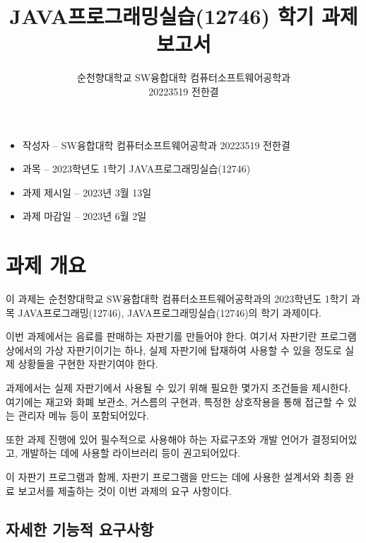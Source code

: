 \documentclass{oblivoir}
\title{JAVA프로그래밍실습(12746) 학기 과제 보고서}
\author{순천향대학교 SW융합대학 컴퓨터소프트웨어공학과\\20223519 전한결}
\begin{document}
    \maketitle

    \begin{itemize}
        \item 작성자 – SW융합대학 컴퓨터소프트웨어공학과 20223519 전한결
        \item 과목 – 2023학년도 1학기 JAVA프로그래밍실습(12746)
        \item 과제 제시일 – 2023년 3월 13일
        \item 과제 마감일 – 2023년 6월 2일
    \end{itemize}

    \pagebreak

    \tableofcontents

    \pagebreak

    \section{과제 개요}
    \label{sec:overview}

    이 과제는 순천향대학교 SW융합대학 컴퓨터소프트웨어공학과의
    2023학년도 1학기 과목 JAVA프로그래밍(12746), JAVA프로그래밍실습(12746)의
    학기 과제이다.

    이번 과제에서는 음료를 판매하는 자판기를 만들어야 한다.
    여기서 자판기란 프로그램상에서의 가상 자판기이기는 하나,
    실제 자판기에 탑재하여 사용할 수 있을 정도로 실제 상황들을
    구현한 자판기여야 한다.

    과제에서는 실제 자판기에서 사용될 수 있기 위해 필요한 몇가지
    조건들을 제시한다.
    여기에는 재고와 화폐 보관소, 거스름의 구현과, 특정한 상호작용을 통해
    접근할 수 있는 관리자 메뉴 등이 포함되어있다.

    또한 과제 진행에 있어 필수적으로 사용해야 하는 자료구조와
    개발 언어가 결정되어있고,
    개발하는 데에 사용할 라이브러리 등이 권고되어있다.

    이 자판기 프로그램과 함께,
    자판기 프로그램을 만드는 데에 사용한 설계서와 최종 완료 보고서를
    제출하는 것이 이번 과제의 요구 사항이다.

    \subsection{자세한 기능적 요구사항}
    \label{subsec:requirements}
\end{document}
